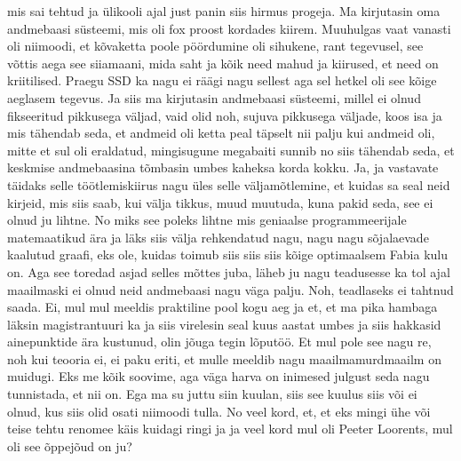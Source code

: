 mis sai tehtud ja ülikooli ajal just panin siis hirmus progeja. Ma kirjutasin oma andmebaasi süsteemi, mis oli fox proost kordades kiirem. Muuhulgas vaat vanasti oli niimoodi, et kõvaketta poole pöördumine oli sihukene, rant tegevusel, see võttis aega see siiamaani, mida saht ja kõik need mahud ja kiirused, et need on kriitilised. Praegu SSD ka nagu ei räägi nagu sellest aga sel hetkel oli see kõige aeglasem tegevus. Ja siis ma kirjutasin andmebaasi süsteemi, millel ei olnud fikseeritud pikkusega väljad, vaid olid noh, sujuva pikkusega väljade, koos isa ja mis tähendab seda, et andmeid oli ketta peal täpselt nii palju kui andmeid oli, mitte et sul oli eraldatud, mingisugune megabaiti sunnib no siis tähendab seda, et keskmise andmebaasina tõmbasin umbes kaheksa korda kokku. Ja, ja vastavate täidaks selle töötlemiskiirus nagu üles selle väljamõtlemine, et kuidas sa seal neid kirjeid, mis siis saab, kui välja tikkus, muud muutuda, kuna pakid seda, see ei olnud ju lihtne. No miks see poleks lihtne mis geniaalse programmeerijale matemaatikud ära ja läks siis välja rehkendatud nagu, nagu nagu sõjalaevade kaalutud graafi, eks ole, kuidas toimub siis siis siis kõige optimaalsem Fabia kulu on. Aga see toredad asjad selles mõttes juba, läheb ju nagu teadusesse ka tol ajal maailmaski ei olnud neid andmebaasi nagu väga palju. Noh, teadlaseks ei tahtnud saada. Ei, mul mul meeldis praktiline pool kogu aeg ja et, et ma pika hambaga läksin magistrantuuri ka ja siis virelesin seal kuus aastat umbes ja siis hakkasid ainepunktide ära kustunud, olin jõuga tegin lõputöö. Et mul pole see nagu re, noh kui teooria ei, ei paku eriti, et mulle meeldib nagu maailmamurdmaailm on muidugi. Eks me kõik soovime, aga väga harva on inimesed julgust seda nagu tunnistada, et nii on. Ega ma su juttu siin kuulan, siis see kuulus siis või ei olnud, kus siis olid osati niimoodi tulla. No veel kord, et, et eks mingi ühe või teise tehtu renomee käis kuidagi ringi ja ja veel kord mul oli Peeter Loorents, mul oli see õppejõud on ju?

